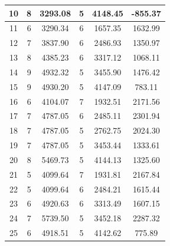 {\begin{longtable}{|c|c|c|c|c|c|}
    10           & 8                                 & 3293.08 & 5 & 4148.45 & -855.37     \\ \hline
    11           & 6                                 & 3290.34 & 6 & 1657.35 & 1632.99     \\
    12           & 7                                 & 3837.90 & 6 & 2486.93 & 1350.97     \\
    13           & 8                                 & 4385.23 & 6 & 3317.12 & 1068.11     \\
    14           & 9                                 & 4932.32 & 5 & 3455.90 & 1476.42     \\
    15           & 9                                 & 4930.20 & 5 & 4147.09 & 783.11      \\ \hline
    16           & 6                                 & 4104.07 & 7 & 1932.51 & 2171.56     \\
    17           & 7                                 & 4787.05 & 6 & 2485.11 & 2301.94     \\
    18           & 7                                 & 4787.05 & 5 & 2762.75 & 2024.30     \\
    19           & 7                                 & 4787.05 & 5 & 3453.44 & 1333.61     \\
    20           & 8                                 & 5469.73 & 5 & 4144.13 & 1325.60     \\ \hline
    21           & 5                                 & 4099.64 & 7 & 1931.81 & 2167.84     \\
    22           & 5                                 & 4099.64 & 6 & 2484.21 & 1615.44     \\
    23           & 6                                 & 4920.63 & 6 & 3313.49 & 1607.15     \\
    24           & 7                                 & 5739.50 & 5 & 3452.18 & 2287.32     \\
    25           & 6                                 & 4918.51 & 5 & 4142.62 & 775.89      \\ \hline
\end{longtable}

}
